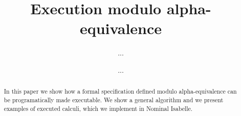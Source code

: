 \documentclass{llncs}
\begin{document}
\title{Execution modulo alpha-equivalence}
\author{... \and ...}

\maketitle

\begin{abstract}
  In this paper we show how a formal specification defined modulo
  alpha-equivalence can be programatically made executable.
  We show a general algorithm and we present examples of
  executed calculi, which we implement in Nominal Isabelle.
\end{abstract}





\end{document}
